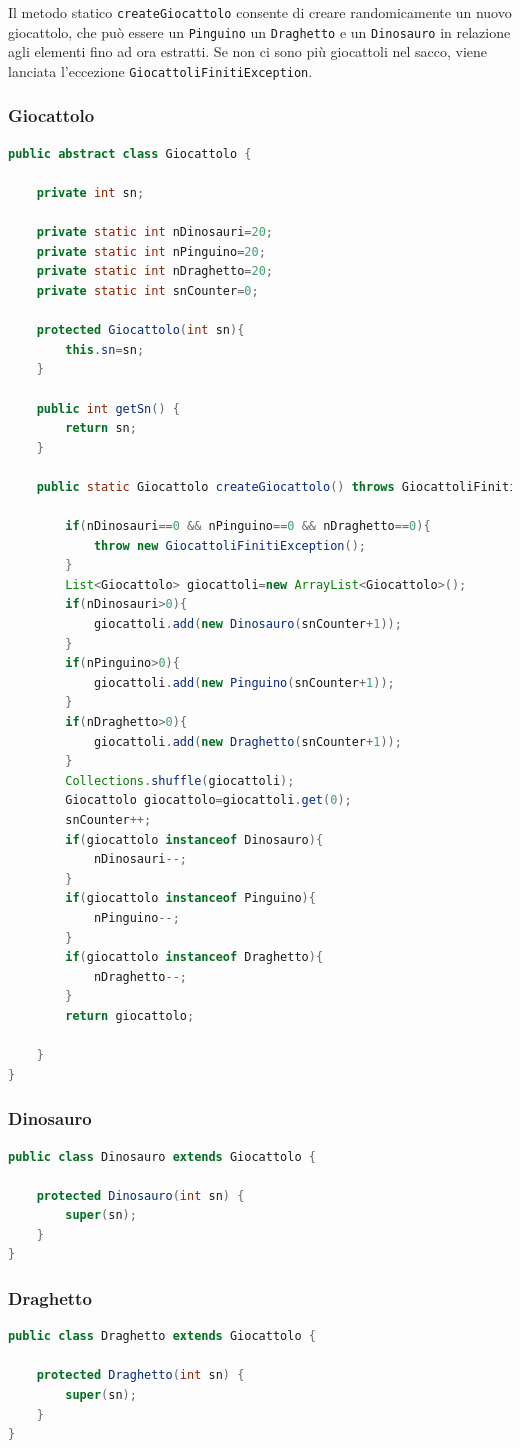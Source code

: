 \documentclass{article}
\begin{document}
Il metodo statico \texttt{createGiocattolo} consente di creare randomicamente un nuovo giocattolo, che pu\`o essere un \texttt{Pinguino} un \texttt{Draghetto} e un \texttt{Dinosauro} in relazione agli elementi fino ad ora estratti. Se non ci sono pi\`u giocattoli nel sacco, viene lanciata l'eccezione \texttt{GiocattoliFinitiException}.


\subsubsection{Giocattolo}
\begin{lstlisting}[language=Java]
public abstract class Giocattolo {

	private int sn;
	
	private static int nDinosauri=20;
	private static int nPinguino=20;
	private static int nDraghetto=20;
	private static int snCounter=0;

	protected Giocattolo(int sn){
		this.sn=sn;
	}

	public int getSn() {
		return sn;
	}
	
	public static Giocattolo createGiocattolo() throws GiocattoliFinitiException{
		
		if(nDinosauri==0 && nPinguino==0 && nDraghetto==0){
			throw new GiocattoliFinitiException();
		}
		List<Giocattolo> giocattoli=new ArrayList<Giocattolo>();
		if(nDinosauri>0){
			giocattoli.add(new Dinosauro(snCounter+1));
		}
		if(nPinguino>0){
			giocattoli.add(new Pinguino(snCounter+1));
		}
		if(nDraghetto>0){
			giocattoli.add(new Draghetto(snCounter+1));
		}
		Collections.shuffle(giocattoli);
		Giocattolo giocattolo=giocattoli.get(0);
		snCounter++;
		if(giocattolo instanceof Dinosauro){
			nDinosauri--;
		}
		if(giocattolo instanceof Pinguino){
			nPinguino--;
		}
		if(giocattolo instanceof Draghetto){
			nDraghetto--;
		}
		return giocattolo;
		
	}
}
\end{lstlisting}

\subsubsection{Dinosauro}
\begin{lstlisting}[language=Java]
public class Dinosauro extends Giocattolo {

	protected Dinosauro(int sn) {
		super(sn);
	}
}
\end{lstlisting}

\subsubsection{Draghetto}
\begin{lstlisting}[language=Java]
public class Draghetto extends Giocattolo {

	protected Draghetto(int sn) {
		super(sn);
	}
}
\end{lstlisting}
\end{document}
